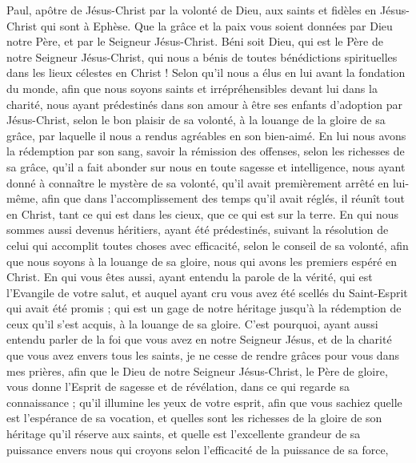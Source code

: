 \par\nobreak\noindent\hrulefill
\begin{multicols}{2}
\VerseOne{}Paul, apôtre de Jésus-Christ par la volonté de Dieu, aux saints et fidèles en Jésus-Christ qui sont à Ephèse.
Que la grâce et la paix vous soient données par Dieu notre Père, et par le Seigneur Jésus-Christ.
Béni soit Dieu, qui est le Père de notre Seigneur Jésus-Christ, qui nous a bénis de toutes bénédictions spirituelles dans les lieux célestes en Christ !
Selon qu'il nous a élus en lui avant la fondation du monde, afin que nous soyons saints et irrépréhensibles devant lui dans la charité, 
nous ayant prédestinés dans son amour à être ses enfants d'adoption par Jésus-Christ, selon le bon plaisir de sa volonté,
à la louange de la gloire de sa grâce, par laquelle il nous a rendus agréables en son bien-aimé.
En lui nous avons la rédemption par son sang, savoir la rémission des offenses, selon les richesses de sa grâce,
qu'il a fait abonder sur nous en toute sagesse et intelligence,
nous ayant donné à connaître le mystère de sa volonté, qu'il avait premièrement arrêté en lui-même,
afin que dans l'accomplissement des temps qu'il avait réglés, il réunît tout en Christ, tant ce qui est dans les cieux, que ce qui est sur la terre. 
 En qui nous sommes aussi devenus héritiers, ayant été prédestinés, suivant la résolution de celui qui accomplit toutes choses avec efficacité, selon le conseil de sa volonté,
afin que nous soyons à la louange de sa gloire, nous qui avons les premiers espéré en Christ.
En qui vous êtes aussi, ayant entendu la parole de la vérité, qui est  l’Evangile de votre salut, et auquel ayant cru vous avez été scellés du Saint-Esprit qui avait été promis ;
qui est un gage de notre héritage jusqu'à la rédemption de ceux qu'il s'est acquis, à la louange de sa gloire.
C'est pourquoi, ayant aussi entendu parler de la foi que vous avez en notre Seigneur Jésus, et de la charité que vous avez envers tous les saints,
je ne cesse de rendre grâces pour vous dans mes prières,
afin que le Dieu de notre Seigneur Jésus-Christ, le Père de gloire, vous donne l'Esprit de sagesse et de révélation, dans ce qui regarde sa connaissance ;
qu'il illumine les yeux de votre esprit, afin que vous sachiez quelle est l'espérance de sa vocation, et quelles sont les richesses de la gloire de son héritage qu'il réserve aux saints,
et quelle est l’excellente grandeur de sa puissance envers nous qui croyons selon l’efficacité de la puissance de sa force, 

\end{multicols}
